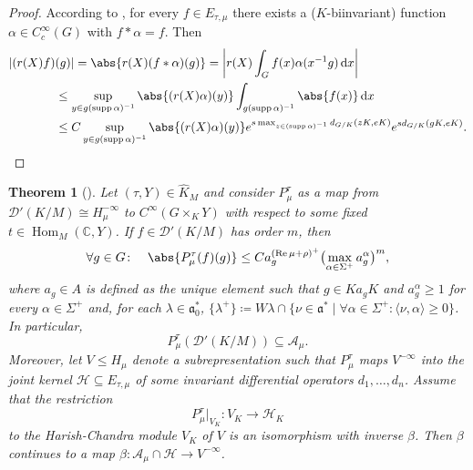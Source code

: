\documentclass[JEP,XML,SOM,NoFloatCountersInSection,Unicode,published]{cedram}
\newtheorem{theorem}{Theorem}[section]
\theoremstyle{definition}
\DeclarePairedDelimiter{\abs}\lvert\rvert
\newcommand{\mc}[1]{\ensuremath{\mathcal{#1}}}
\newcommand{\mf}[1]{\ensuremath{\mathfrak{#1}}}
\newcommand{\on}[1]{\ensuremath{\operatorname{#1}}}
\newcommand{\Hom}[3]{\ensuremath{\on{Hom}_{#1}(#2,#3)}}
\newcommand{\rhoa}{\ensuremath{\rho}}
\newcommand{\C}{\ensuremath{\mathbb{C}}}
\newcommand{\pst}[1]{\ensuremath{H_{#1}}}
\newcommand{\pstd}[1]{\ensuremath{H_{#1}^{-\infty}}}
\newcommand{\intd}{\ensuremath{\,\mathrm{d}}}
\begin{document}
\begin{proof}
According to \cite[Th.\,1]{HC66}, for every $f\in E_{\tau,\mu}$ there exists a ($K$-biinvariant) function $\alpha\in C_c^\infty(G)$ with $f*\alpha=f$. Then
\begin{align*}
|(r(X)f)&(g)|=\abs{r(X)(f*\alpha)(g)}=\biggl|r(X)\int_Gf(x)\alpha(x^{-1}g)\intd x\biggr|\\
&\leq\sup_{y\in g(\on{supp}\alpha)^{-1}}\abs{(r(X)\alpha)(y)}\int_{g(\on{supp}\alpha)^{-1}}\abs{f(x)}\intd x\\
&\leq C\sup_{y\in g(\on{supp}\alpha)^{-1}}\abs{(r(X)\alpha)(y)}e^{s\max_{z\in(\on{supp}\alpha)^{-1}}d_{G/K}(zK,eK)}e^{sd_{G/K}(gK,eK)}.\qedhere
\end{align*}
\end{proof}

\begin{theorem}[{\cite[Satz 4.13]{Ol}}]\label{thm:cas_glob}
Let $(\tau, Y)\in\hat K_M$ and consider $P_\mu^\tau$ as a map from $\mc D'(K/M)\cong\pstd{\mu}$ to $C^\infty(G\times_KY)$ with respect to some fixed $t\in\Hom{M}{\C}{Y}$. If $f\in\mc D'(K/M)$ has order $m$, then
\[
\forall g\in G\colon\quad\abs{P_{\mu}^\tau(f)(g)}\leq Ca_g^{(\on{Re}\mu+\rhoa)^+}\bigl(\max_{\alpha\in\Sigma^+}a_g^\alpha\bigr)^m,
\]
where $a_g\in A$ is defined as the unique element such that $g\in Ka_gK$ and $a_g^\alpha\geq 1$ for every $\alpha\in\Sigma^+$ and, for each $\lambda\in\mf a_0^*$, $\{\lambda^+\}\coloneqq W\lambda\cap\{\nu\in\mf a^*\mid \forall\alpha\in\Sigma^+\colon\langle\nu,\alpha\rangle\geq 0\}$. In particular,
\[
P_\mu^\tau(\mc D'(K/M))\subseteq\mc A_\mu.
\]
Moreover, let $V\leq\pst{\mu}$ denote a subrepresentation such that $P_\mu^\tau$ maps $V^{-\infty}$ into the joint kernel $\mc H\subseteq E_{\tau,\mu}$ of some invariant differential operators $d_1,\ldots,d_n$. Assume that the restriction
\[
P_\mu^\tau\vert_{V_K}\colon V_K\to\mc H_K
\]
to the Harish-Chandra module $V_K$ of $V$ is an isomorphism with inverse $\beta$. Then $\beta$ continues to a map $\beta\colon\mc A_\mu\cap\mc H\to V^{-\infty}$.
\end{theorem}
\end{document}
